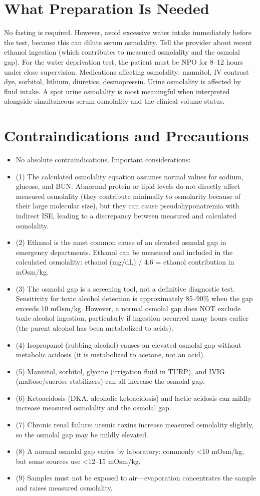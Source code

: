 \section*{What Preparation Is Needed}
No fasting is required. However, avoid excessive water intake immediately before the test, because this can dilute serum osmolality. Tell the provider about recent ethanol ingestion (which contributes to measured osmolality and the osmolal gap). For the water deprivation test, the patient must be NPO for 8--12 hours under close supervision. Medications affecting osmolality: mannitol, IV contrast dye, sorbitol, lithium, diuretics, desmopressin. Urine osmolality is affected by fluid intake. A spot urine osmolality is most meaningful when interpreted alongside simultaneous serum osmolality and the clinical volume status.

\section*{Contraindications and Precautions}
\begin{itemize}
  \item No absolute contraindications. Important considerations:
  \item (1) The calculated osmolality equation assumes normal values for sodium, glucose, and BUN. Abnormal protein or lipid levels do not directly affect measured osmolality (they contribute minimally to osmolarity because of their large molecular size), but they can cause pseudohyponatremia with indirect ISE, leading to a discrepancy between measured and calculated osmolality.
  \item (2) Ethanol is the most common cause of an elevated osmolal gap in emergency departments. Ethanol can be measured and included in the calculated osmolality: ethanol (mg/dL) / 4.6 = ethanol contribution in mOsm/kg.
  \item (3) The osmolal gap is a screening tool, not a definitive diagnostic test. Sensitivity for toxic alcohol detection is approximately 85--90\% when the gap exceeds 10 mOsm/kg. However, a normal osmolal gap does NOT exclude toxic alcohol ingestion, particularly if ingestion occurred many hours earlier (the parent alcohol has been metabolized to acids).
  \item (4) Isopropanol (rubbing alcohol) causes an elevated osmolal gap without metabolic acidosis (it is metabolized to acetone, not an acid).
  \item (5) Mannitol, sorbitol, glycine (irrigation fluid in TURP), and IVIG (maltose/sucrose stabilizers) can all increase the osmolal gap.
  \item (6) Ketoacidosis (DKA, alcoholic ketoacidosis) and lactic acidosis can mildly increase measured osmolality and the osmolal gap.
  \item (7) Chronic renal failure: uremic toxins increase measured osmolality slightly, so the osmolal gap may be mildly elevated.
  \item (8) A normal osmolal gap varies by laboratory: commonly <10 mOsm/kg, but some sources use <12--15 mOsm/kg.
  \item (9) Samples must not be exposed to air---evaporation concentrates the sample and raises measured osmolality.
\end{itemize}
